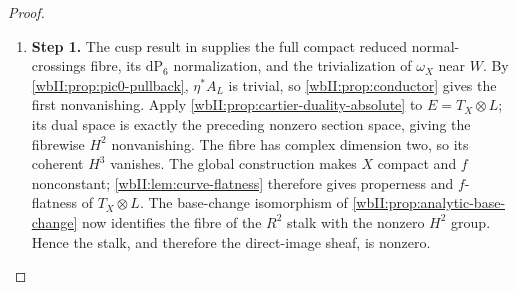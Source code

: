 \begin{proof}
\begin{enumerate}[label={$\langle1\rangle$\arabic*.},leftmargin=*]
\item 
\noindent\textbf{Step 1.} The cusp result in  supplies the full compact
reduced normal-crossings fibre, its $\mathrm{dP}_6$ normalization, and the
trivialization of $\omega_X$ near $W$.  By
\cref{wbII:prop:pic0-pullback}, $\eta^*A_L$ is trivial, so
\cref{wbII:prop:conductor} gives the first nonvanishing.  Apply
\cref{wbII:prop:cartier-duality-absolute} to $E=T_X\otimes L$; its dual space is
exactly the preceding nonzero section space, giving the fibrewise $H^2$
nonvanishing.  The fibre has complex dimension two, so its coherent
$H^3$ vanishes.  The global construction makes $X$ compact and $f$
nonconstant; \cref{wbII:lem:curve-flatness} therefore gives properness and
$f$-flatness of $T_X\otimes L$.  The base-change isomorphism of
\cref{wbII:prop:analytic-base-change} now identifies the fibre of the $R^2$
stalk with the nonzero $H^2$ group.  Hence the stalk, and therefore the
direct-image sheaf, is nonzero.

\end{enumerate}
\end{proof}
